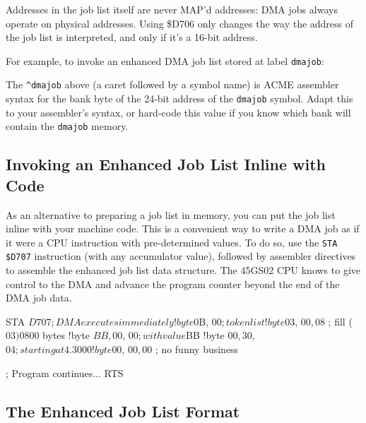 Addresses in the job list itself are never MAP'd addresses: DMA jobs always operate on physical addresses. Using \$D706 only changes the way the address of the job list is interpreted, and only if it's a 16-bit address.

For example, to invoke an enhanced DMA job list stored at label {\tt dmajob}:


The {\tt \^{}dmajob} above (a caret followed by a symbol name) is ACME assembler syntax for the bank byte of the 24-bit address of the {\tt dmajob} symbol. Adapt this to your assembler's syntax, or hard-code this value if you know which bank will contain the {\tt dmajob} memory.

\subsection{Invoking an Enhanced Job List Inline with Code}

As an alternative to preparing a job list in memory, you can put the job list inline with your machine code. This is a convenient way to write a DMA job as if it were a CPU instruction with pre-determined values. To do so, use the \texttt{STA \$D707} instruction (with any accumulator value), followed by assembler directives to assemble the enhanced job list data structure. The 45GS02 CPU knows to give control to the DMA and advance the program counter beyond the end of the DMA job data.

\begin{asmcode}
STA $D707  ; DMA executes immediately
!byte $0B, $00       ; token list
!byte $03, $00, $08  ; fill ($03) $0800 bytes
!byte $BB, $00, $00  ; with value $BB
!byte $00, $30, $04  ; starting at 4.3000
!byte $00, $00, $00  ; no funny business

; Program continues...
RTS
\end{asmcode}

\subsection{The Enhanced Job List Format}


